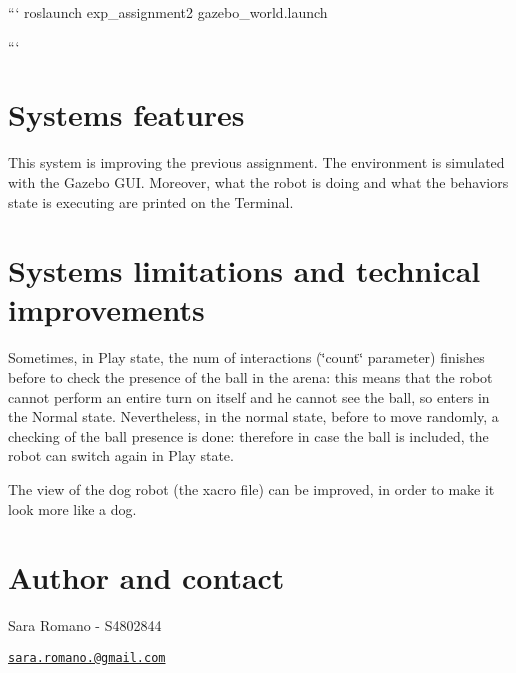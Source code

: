 \begin{DoxyVerb}```
roslaunch exp_assignment2 gazebo_world.launch

```
\end{DoxyVerb}


\section*{System\textquotesingle{}s features}

This system is improving the previous assignment. The environment is simulated with the Gazebo G\+UI. Moreover, what the robot is doing and what the behavior\textquotesingle{}s state is executing are printed on the Terminal.

\section*{System\textquotesingle{}s limitations and technical improvements}

Sometimes, in Play state, the num of interactions (\char`\"{}count\char`\"{} parameter) finishes before to check the presence of the ball in the arena\+: this means that the robot cannot perform an entire turn on itself and he cannot see the ball, so enters in the Normal state. Nevertheless, in the normal state, before to move randomly, a checking of the ball presence is done\+: therefore in case the ball is included, the robot can switch again in Play state.

The view of the dog robot (the xacro file) can be improved, in order to make it look more like a dog.

\section*{Author and contact}

Sara Romano -\/ S4802844

\href{mailto:sara.romano.15@gmail.com}{\tt sara.\+romano.@gmail.\+com} 